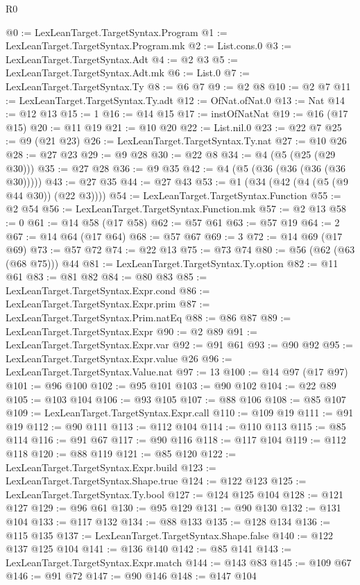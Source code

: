\begin{lexlean}{R0}
\begin{coremodule}
@0 := LexLeanTarget.TargetSyntax.Program
@1 := LexLeanTarget.TargetSyntax.Program.mk
@2 := List.cons.{0}
@3 := LexLeanTarget.TargetSyntax.Adt
@4 := @2 @3
@5 := LexLeanTarget.TargetSyntax.Adt.mk
@6 := List.{0}
@7 := LexLeanTarget.TargetSyntax.Ty
@8 := @6 @7
@9 := @2 @8
@10 := @2 @7
@11 := LexLeanTarget.TargetSyntax.Ty.adt
@12 := OfNat.ofNat.{0}
@13 := Nat
@14 := @12 @13
@15 := 1
@16 := @14 @15
@17 := instOfNatNat
@19 := @16 (@17 @15)
@20 := @11 @19
@21 := @10 @20
@22 := List.nil.{0}
@23 := @22 @7
@25 := @9 (@21 @23)
@26 := LexLeanTarget.TargetSyntax.Ty.nat
@27 := @10 @26
@28 := @27 @23
@29 := @9 @28
@30 := @22 @8
@34 := @4 (@5 (@25 (@29 @30)))
@35 := @27 @28
@36 := @9 @35
@42 := @4 (@5 (@36 (@36 (@36 (@36 @30)))))
@43 := @27 @35
@44 := @27 @43
@53 := @1 (@34 (@42 (@4 (@5 (@9 @44 @30)) (@22 @3))))
@54 := LexLeanTarget.TargetSyntax.Function
@55 := @2 @54
@56 := LexLeanTarget.TargetSyntax.Function.mk
@57 := @2 @13
@58 := 0
@61 := @14 @58 (@17 @58)
@62 := @57 @61
@63 := @57 @19
@64 := 2
@67 := @14 @64 (@17 @64)
@68 := @57 @67
@69 := 3
@72 := @14 @69 (@17 @69)
@73 := @57 @72
@74 := @22 @13
@75 := @73 @74
@80 := @56 (@62 (@63 (@68 @75))) @44
@81 := LexLeanTarget.TargetSyntax.Ty.option
@82 := @11 @61
@83 := @81 @82
@84 := @80 @83
@85 := LexLeanTarget.TargetSyntax.Expr.cond
@86 := LexLeanTarget.TargetSyntax.Expr.prim
@87 := LexLeanTarget.TargetSyntax.Prim.natEq
@88 := @86 @87
@89 := LexLeanTarget.TargetSyntax.Expr
@90 := @2 @89
@91 := LexLeanTarget.TargetSyntax.Expr.var
@92 := @91 @61
@93 := @90 @92
@95 := LexLeanTarget.TargetSyntax.Expr.value @26
@96 := LexLeanTarget.TargetSyntax.Value.nat
@97 := 13
@100 := @14 @97 (@17 @97)
@101 := @96 @100
@102 := @95 @101
@103 := @90 @102
@104 := @22 @89
@105 := @103 @104
@106 := @93 @105
@107 := @88 @106
@108 := @85 @107
@109 := LexLeanTarget.TargetSyntax.Expr.call
@110 := @109 @19
@111 := @91 @19
@112 := @90 @111
@113 := @112 @104
@114 := @110 @113
@115 := @85 @114
@116 := @91 @67
@117 := @90 @116
@118 := @117 @104
@119 := @112 @118
@120 := @88 @119
@121 := @85 @120
@122 := LexLeanTarget.TargetSyntax.Expr.build
@123 := LexLeanTarget.TargetSyntax.Shape.true
@124 := @122 @123
@125 := LexLeanTarget.TargetSyntax.Ty.bool
@127 := @124 @125 @104
@128 := @121 @127
@129 := @96 @61
@130 := @95 @129
@131 := @90 @130
@132 := @131 @104
@133 := @117 @132
@134 := @88 @133
@135 := @128 @134
@136 := @115 @135
@137 := LexLeanTarget.TargetSyntax.Shape.false
@140 := @122 @137 @125 @104
@141 := @136 @140
@142 := @85 @141
@143 := LexLeanTarget.TargetSyntax.Expr.match
@144 := @143 @83
@145 := @109 @67
@146 := @91 @72
@147 := @90 @146
@148 := @147 @104

\end{coremodule}
\end{lexlean}

